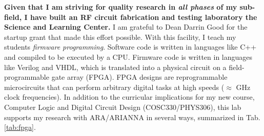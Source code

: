 \documentclass[../../main.tex]{subfiles}
\begin{document}
\textbf{Given that I am striving for quality research in \textit{all phases} of my sub-field, I have built an RF circuit fabrication and testing laboratory the Science and Learning Center.}  I am grateful to Dean Darrin Good for the startup grant that made this effort possible.  With this facility, I teach my students \textit{firmware programming}.  Software code is written in languages like C++ and compiled to be executed by a CPU.  Firmware code is written in languages like Verilog and VHDL, which is translated into a physical circuit on a field-programmable gate array (FPGA).  FPGA designs are reprogrammable microcircuits that can perform arbitrary digital tasks at high speeds ($\approx$ GHz clock frequencies).  In addition to the curricular implications for my new course, Computer Logic and Digital Circuit Design (COSC330/PHYS306), this lab supports my research with ARA/ARIANNA in several ways, summarized in Tab. \ref{tab:fpga}. \\ \hspace{0.1cm}
\end{document}

